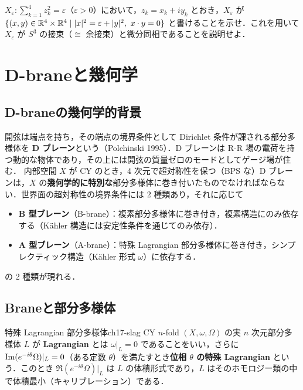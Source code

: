 $X_\varepsilon:\sum_{k=1}^4z_k^2=\varepsilon$（$\varepsilon>0$）において，$z_k=x_k+iy_k$ とおき，$X_\varepsilon$ が $\{(x,y)\in\mathbb{R}^4\times\mathbb{R}^4\mid |x|^2=\varepsilon+|y|^2,\ x\cdot y=0\}$ と書けることを示せ．これを用いて $X_\varepsilon$ が $S^3$ の接束（$\cong$ 余接束）と微分同相であることを説明せよ．

\section{D-braneと幾何学}

\subsection{D-braneの幾何学的背景}

開弦は端点を持ち，その端点の境界条件として Dirichlet 条件が課される部分多様体を \textbf{D ブレーン}という（Polchinski 1995）．D ブレーンは R-R 場の電荷を持つ動的な物体であり，その上には開弦の質量ゼロのモードとしてゲージ場が住む．
内部空間 $X$ が CY のとき，4 次元で超対称性を保つ（BPS な）D ブレーンは，$X$ の\textbf{幾何学的に特別な}部分多様体に巻き付いたものでなければならない．世界面の超対称性の境界条件には 2 種類あり，それに応じて
\begin{itemize}
\item \textbf{B 型ブレーン}（B-brane）：複素部分多様体に巻き付き，複素構造にのみ依存する（K\"ahler 構造には安定性条件を通じてのみ依存）．
\item \textbf{A 型ブレーン}（A-brane）：特殊 Lagrangian 部分多様体に巻き付き，シンプレクティック構造（K\"ahler 形式 $\omega$）に依存する．
\end{itemize}
の 2 種類が現れる．

\subsection{Braneと部分多様体}

\begin{mydef}{特殊 Lagrangian 部分多様体}{ch17-slag}
CY $n$-fold $(X,\omega,\Omega)$ の実 $n$ 次元部分多様体 $L$ が \textbf{Lagrangian} とは $\omega|_L=0$ であることをいい，さらに $\operatorname{Im}(e^{-i\theta}\Omega)|_L=0$（ある定数 $\theta$）を満たすとき\textbf{位相 $\theta$ の特殊 Lagrangian} という．このとき $\Re(e^{-i\theta}\Omega)|_L$ は $L$ の体積形式であり，$L$ はそのホモロジー類の中で体積最小（キャリブレーション）である．
\end{mydef}

